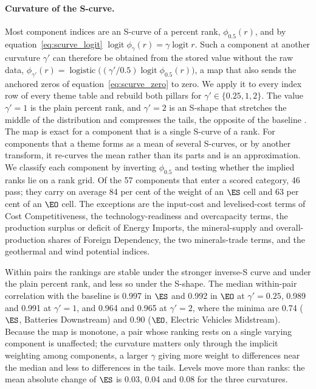 \paragraph{Curvature of the S-curve.} Most component indices are an S-curve of a percent
rank, $\phi_{0.5}(r)$, and by equation~\eqref{eq:scurve_logit} $\operatorname{logit}\phi_\gamma(r)=
\gamma\operatorname{logit}r$. Such a component at another curvature $\gamma'$ can therefore be
obtained from the stored value without the raw data,
$\phi_{\gamma'}(r)=\operatorname{logistic}\bigl((\gamma'/0.5)\operatorname{logit}\phi_{0.5}(r)
\bigr)$, a map that also sends the anchored zeros of equation~\eqref{eq:scurve_zero} to zero.
We apply it to every index row of every theme table and rebuild both pillars for
$\gamma'\in\{0.25,1,2\}$. The value $\gamma'=1$ is the plain percent rank, and $\gamma'=2$ is
an S-shape that stretches the middle of the distribution and compresses the tails, the opposite
of the baseline \citep{karmarkar1978subjectively}. The map is exact for a component that is a
single S-curve of a rank. For components that a theme forms as a mean of several S-curves, or
by another transform, it re-curves the mean rather than its parts and is an approximation. We
classify each component by inverting $\phi_{0.5}$ and testing whether the implied ranks lie on a
rank grid. Of the 57 components that enter a scored category, 46 pass; they carry on average
84 per cent of the weight of an $\ES$ cell and 63 per cent of an $\EO$ cell. The exceptions are
the input-cost and levelised-cost terms of Cost Competitiveness, the technology-readiness and
overcapacity terms, the production surplus or deficit of Energy Imports, the mineral-supply and
overall-production shares of Foreign Dependency, the two minerals-trade terms, and the
geothermal and wind potential indices.

Within pairs the rankings are stable under the stronger inverse-S curve and under the plain
percent rank, and less so under the S-shape. The median within-pair correlation with the
baseline is 0.997 in $\ES$ and 0.992 in $\EO$ at $\gamma'=0.25$, 0.989 and 0.991 at
$\gamma'=1$, and 0.964 and 0.965 at $\gamma'=2$, where the minima are 0.74 ($\ES$, Batteries
Downstream) and 0.90 ($\EO$, Electric Vehicles Midstream). Because the map is monotone, a pair
whose ranking rests on a single varying component is unaffected; the curvature matters only
through the implicit weighting among components, a larger $\gamma$ giving more weight to
differences near the median and less to differences in the tails. Levels move more than ranks:
the mean absolute change of $\ES$ is 0.03, 0.04 and 0.08 for the three curvatures.

